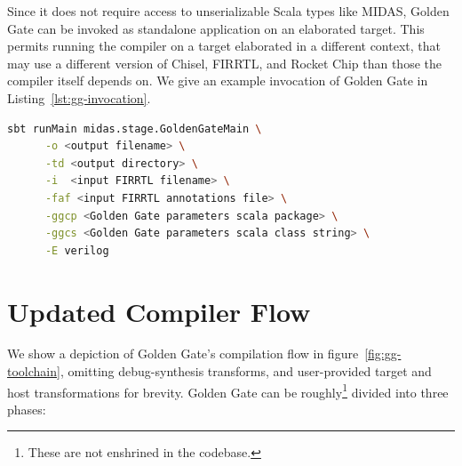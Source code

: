 Since it does not require access to unserializable Scala
types like MIDAS, Golden Gate can be invoked as standalone application on an
elaborated target. This permits running the
compiler on a target elaborated in a different context, that may use a
different version of Chisel, FIRRTL, and Rocket Chip than those the compiler
itself depends on.  We give an example invocation of Golden Gate in Listing~\ref{lst:gg-invocation}.

\begin{lstlisting}[style=shell, language=bash, label={lst:gg-invocation}, caption=An example command-line invocation of Golden Gate.]
  sbt runMain midas.stage.GoldenGateMain \
      -o <output filename> \
      -td <output directory> \
      -i  <input FIRRTL filename> \
      -faf <input FIRRTL annotations file> \
      -ggcp <Golden Gate parameters scala package> \
      -ggcs <Golden Gate parameters scala class string> \
      -E verilog
\end{lstlisting}

\section{Updated Compiler Flow}

We show a depiction of Golden Gate's compilation flow in figure~\ref{fig:gg-toolchain},
omitting debug-synthesis transforms, and user-provided target and host
transformations for brevity. Golden Gate can be roughly\footnote{These are not enshrined in the codebase.} divided into three phases:

